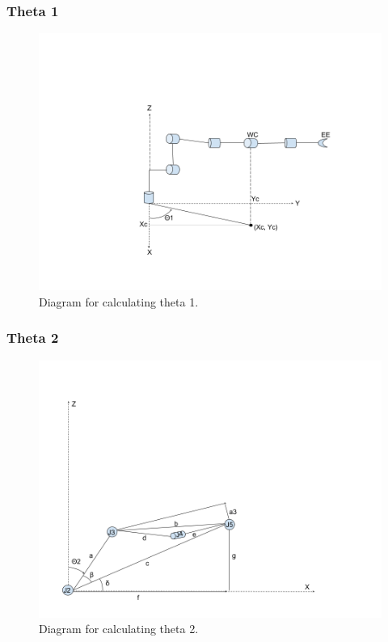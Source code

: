 \documentclass{article}
\begin{document}
\subsubsection{Theta 1}
\begin{figure}[H]
    \includegraphics[width=\linewidth]{theta1.png}
    \caption{Diagram for calculating theta 1.}
    \label{fig:theta3}
\end{figure}

\subsubsection{Theta 2}
\begin{figure}[H]
    \includegraphics[width=\linewidth]{theta2.png}
    \caption{Diagram for calculating theta 2.}
    \label{fig:theta3}
\end{figure}
\end{document}
